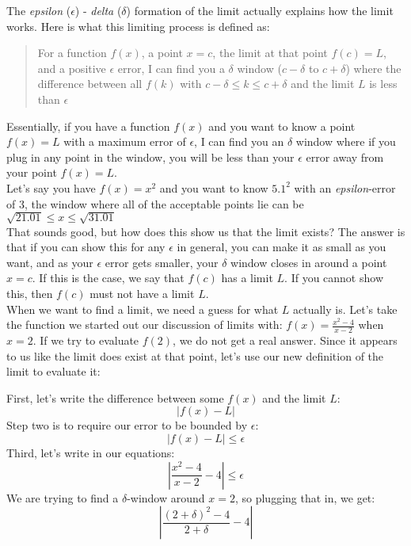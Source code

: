 \documentclass[../revisedmain.tex]{subfiles}
\begin{document}
	The \textit{epsilon} ($\epsilon$) - \textit{delta} ($\delta$) formation of the limit actually explains how the limit works. Here is what this limiting process is defined as:
	\begin{quote}
		For a function $f(x)$, a point $x=c$, the limit at that point $f(c)=L$, and a positive $\epsilon$ error, I can find you a $\delta$ window ($c-\delta$ to $c+\delta$) where the difference between all $f(k)$ with $c-\delta\le k\le c+\delta$ and the limit $L$ is less than $\epsilon$
	\end{quote}
	Essentially, if you have a function $f(x)$ and you want to know a point $f(x)=L$ with a maximum error of $\epsilon$, I can find you an $\delta$ window where if you plug in any point in the window, you will be less than your $\epsilon$ error away from your point $f(x)=L$.\\
	Let's say you have $f(x)=x^2$ and you want to know $5.1^2$ with an \textit{epsilon}-error of 3, the window where all of the acceptable points lie can be $\sqrt{21.01}\le x\le\sqrt{31.01}$\\\newline
	That sounds good, but how does this show us that the limit exists? The answer is that if you can show this for any $\epsilon$ in general, you can make it as small as you want, and as your $\epsilon$ error gets smaller, your $\delta$ window closes in around a point $x=c$. If this is the case, we say that $f(c)$ has a limit $L$. If you cannot show this, then $f(c)$ must not have a limit $L$.\\\newline
	When we want to find a limit, we need a guess for what $L$ actually is. Let's take the function we started out our discussion of limits with: $f(x)=\displaystyle\frac{x^2-4}{x-2}$ when $x=2$. If we try to evaluate $f(2)$, we do not get a real answer. Since it appears to us like the limit does exist at that point, let's use our new definition of the limit to evaluate it:
	\begin{center}
		First, let's write the difference between some $f(x)$ and the limit $L$:
		$$|f(x)-L|$$
		Step two is to require our error to be bounded by $\epsilon$:
		$$|f(x)-L|\le\epsilon$$
		Third, let's write in our equations:
		$$|\frac{x^2-4}{x-2}-4|\le\epsilon$$
		We are trying to find a $\delta$-window around $x=2$, so plugging that in, we get:
		$$|\frac{(2+\delta)^2-4}{2+\delta}-4|$$
		$$
	\end{center}
\end{document}
